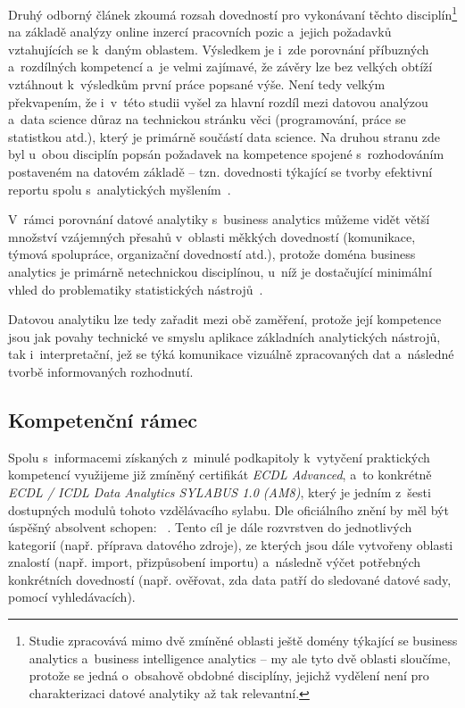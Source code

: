 Druhý odborný článek zkoumá rozsah dovedností pro vykonávaní těchto disciplín\footnote{Studie zpracovává mimo dvě zmíněné oblasti ještě domény týkající se business analytics a~business intelligence analytics – my ale tyto dvě oblasti sloučíme, protože se jedná o~obsahově obdobné disciplíny, jejichž vydělení není pro charakterizaci datové analytiky až tak relevantní.} na základě analýzy online inzercí pracovních pozic a~jejich požadavků vztahujících se k~daným oblastem. Výsledkem je i~zde porovnání příbuzných a~rozdílných kompetencí a~je velmi zajímavé, že závěry lze bez velkých obtíží vztáhnout k~výsledkům první práce popsané výše. Není tedy velkým překvapením, že i~v~této studii vyšel za hlavní rozdíl mezi datovou analýzou a~data science důraz na technickou stránku věci (programování, práce se statistkou atd.), který je primárně součástí data science. Na druhou stranu zde byl u~obou disciplín popsán požadavek na kompetence spojené s~rozhodováním postaveném na datovém základě -- tzn. dovednosti týkající se tvorby efektivní reportu spolu s~analytických myšlením~\parencite[248]{verma19}.

V~rámci porovnání datové analytiky s~business analytics můžeme vidět větší množství vzájemných přesahů v~oblasti měkkých dovedností (komunikace, týmová spolupráce, organizační dovedností atd.), protože doména business analytics je primárně netechnickou disciplínou, u~níž je dostačující minimální vhled do problematiky statistických nástrojů~\parencite[249]{verma19}.

Datovou analytiku lze tedy zařadit mezi obě zaměření, protože její kompetence jsou jak povahy technické ve smyslu aplikace základních analytických nástrojů, tak i~interpretační, jež se týká komunikace vizuálně zpracovaných dat a~následné tvorbě informovaných rozhodnutí.

\hypertarget{kompetenux10dnuxed-ruxe1mec}{%
\subsection{Kompetenční rámec}\label{kompetenux10dnuxed-ruxe1mec}}

Spolu s~informacemi získaných z~minulé podkapitoly k~vytyčení praktických kompetencí využijeme již zmíněný certifikát \emph{ECDL Advanced}, a~to konkrétně \emph{ECDL / ICDL Data Analytics SYLABUS 1.0 (AM8)}, který je jedním z~šesti dostupných modulů tohoto vzdělávacího sylabu. Dle oficiálního znění by měl být úspěšný absolvent schopen: ~\parencite{ecdl17}. Tento cíl je dále rozvrstven do jednotlivých kategorií (např. příprava datového zdroje), ze kterých jsou dále vytvořeny oblasti znalostí (např. import, přizpůsobení importu) a~následně výčet potřebných konkrétních dovedností (např. ověřovat, zda data patří do sledované datové sady, pomocí vyhledávacích).


